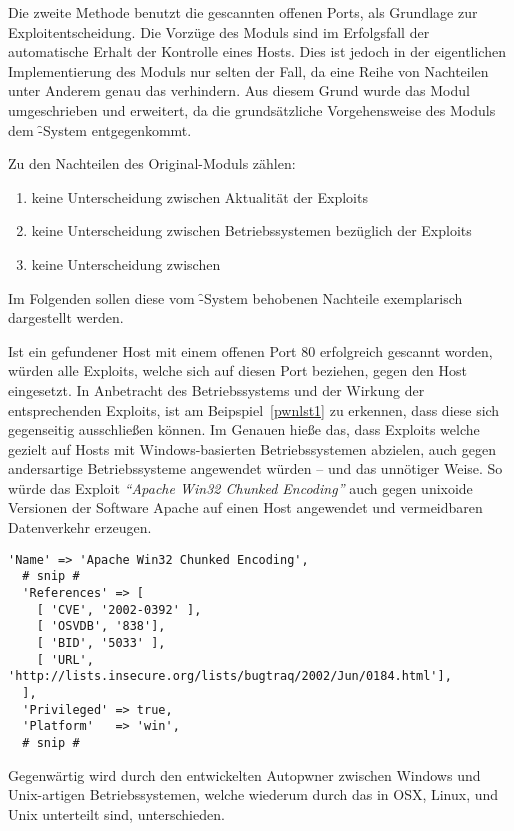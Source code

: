 Die zweite Methode benutzt die gescannten offenen Ports, als
Grundlage zur Exploitentscheidung.
Die Vorzüge des Moduls sind im Erfolgsfall der automatische Erhalt der
Kontrolle eines Hosts. Dies ist jedoch in der eigentlichen
Implementierung des Moduls nur selten der Fall, da eine Reihe von
Nachteilen unter Anderem genau das verhindern. Aus diesem Grund wurde
das Modul umgeschrieben und erweitert, da die grundsätzliche
Vorgehensweise des Moduls dem \f-System entgegenkommt.

Zu den Nachteilen des Original-Moduls zählen:

\begin{enumerate}
  \item keine Unterscheidung zwischen Aktualität der Exploits
  \item keine Unterscheidung zwischen Betriebssystemen bezüglich der Exploits
  \item keine Unterscheidung zwischen 
\end{enumerate}

Im Folgenden sollen diese vom \f-System behobenen Nachteile
exemplarisch dargestellt werden.

Ist ein gefundener Host mit einem offenen Port 80 erfolgreich gescannt
worden, würden alle Exploits, welche sich auf diesen Port beziehen,
gegen den Host eingesetzt. In Anbetracht des Betriebssystems und der
Wirkung der entsprechenden Exploits, ist am Beipspiel~\ref{pwnlst1} zu
erkennen, dass diese sich gegenseitig ausschließen können.  Im Genauen
hieße das, dass Exploits welche gezielt auf Hosts mit
Windows-basierten Betriebssystemen abzielen, auch gegen andersartige
Betriebssysteme angewendet würden -- und das unnötiger Weise.  So würde
das Exploit \textit{\enquote{Apache Win32 Chunked Encoding}} auch gegen
unixoide Versionen der Software Apache auf einen Host angewendet und
vermeidbaren Datenverkehr erzeugen.

\newpage

\begin{lstlisting}[caption={Ausschnitt aus einem Exploit-Header},label=pwnlst1]
  'Name' => 'Apache Win32 Chunked Encoding',
  # snip #
  'References' => [
    [ 'CVE', '2002-0392' ],
    [ 'OSVDB', '838'],
    [ 'BID', '5033' ],
    [ 'URL', 'http://lists.insecure.org/lists/bugtraq/2002/Jun/0184.html'],
  ],
  'Privileged' => true,
  'Platform'   => 'win',
  # snip #
\end{lstlisting}

Gegenwärtig wird durch den entwickelten Autopwner zwischen Windows und
Unix-artigen Betriebssystemen, welche wiederum durch das  in
OSX, Linux, und Unix unterteilt sind, unterschieden.

